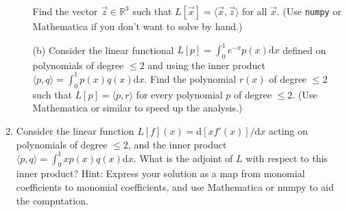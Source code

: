 \documentclass[11pt,fleqn]{article}
\begin{document}
\begin{enumerate}
\begin{itemize}
	Find the vector $\vec{z}\in\mathbb{R}^3$ such that $L[\vec{x}] = \langle\vec{x},\vec{z}\rangle$ for all $\vec{x}$. (Use {\tt numpy} or Mathematica if you don't want to solve by hand.)
	\item[(b)] Consider the linear functional $L[p] = \int_0^1 e^{-x}p(x)\mathrm{d}x$ defined on polynomials of degree $\le 2$ and using the inner product $\langle p,q\rangle = \int_0^1p(x)q(x)\mathrm{d}x.$ Find the polynomial $r(x)$ of degree $\le 2$ such that $L[p] = \langle p,r\rangle$ for every polynomial $p$ of degree $\le 2$.  (Use Mathematica or similar to speed up the analysis.)
	\end{itemize}
\item Consider the linear function $L[f](x) = \mathrm{d}[xf'(x)]/\mathrm{d}x$ acting on polynomials of degree $\le 2$, and the inner product $\langle p,q\rangle = \int_0^1 x p(x) q(x)\mathrm{d}x$. What is the adjoint of $L$ with respect to this inner product? Hint: Express your solution as a map from monomial coefficients to monomial coefficients, and use Mathematica or numpy to aid the computation.
\end{enumerate}
 
\end{document}
